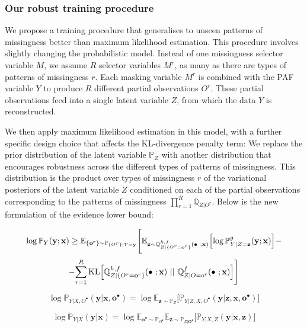 \documentclass[a4paper,12pt,twoside,openright]{article}
\newcommand{\draft}[1]{\textcolor{blue}{#1}}
\begin{document}

\subsubsection{Our robust training procedure}

We propose a training procedure that generalises to unseen patterns of missingness better than maximum likelihood estimation. This procedure involves slightly changing the probabilistic model. Instead of one missingness selector variable $M$, we assume $R$ selector variables $M^r$, as many as there are types of patterns of missingness $r$. Each masking variable $M^r$ is combined with the PAF variable $Y$ to produce $R$ different partial observations $O^r$. These partial observations feed into a single latent variable $Z$, from which the data $Y$ is reconstructed. 

We then apply maximum likelihood estimation in this model, with a further specific design choice that affects the $\mathrm{KL}$-divergence penalty term: We replace the prior distribution of the latent variable $\mathbb{P}_Z$ with another distribution that encourages robustness across the different types of patterns of missingness. This distribution is the product over types of missingness $r$ of the variational posteriors of the latent variable $Z$ conditioned on each of the partial observations corresponding to the patterns of missingness $\prod_{r = 1}^R \mathbb{Q}_{Z | O^r}$. Below is the new formulation of the evidence lower bound:

\[
    \log \mathbb{P}_Y (\mathbf{y} ; \mathbf{x}) \geq \mathbb{E}_{\{\mathbf{o^r}\} \sim \mathbb{P}_{\{O^r\} |Y=\mathbf{y}}} \Biggl[ \mathbb{E}_{\mathbf{z} \sim \mathbb{Q}^{h,f}_{Z | \{O^r = \mathbf{o}^r\}} (\bullet~ ; \mathbf{x})} \Bigl[\log \mathbb{P}^g_{Y | Z = \mathbf{z}} (\mathbf{y} ; \mathbf{x})\Bigr] \Biggr. - 
\]
\[
    - \Biggl. \sum_{r=1}^R  \mathrm{KL} \Bigl[ \mathbb{Q}^{h,f}_{Z | \{O^r = \mathbf{o}^r\}} (\bullet ~ ; \mathbf{x}) ~||~ \mathbb{Q}^{f}_{Z | O = o^r} (\bullet ~ ; \mathbf{x}) \Bigr] \Biggr]
\]

\[
    \log \mathbb{P}_{Y|X, O^\bullet} (\mathbf{y} | \mathbf{x}, \mathbf{o}^\bullet) = \log \mathbb{E}_{\mathbf{z} \sim \mathbb{P}_Z} \bigl[ \mathbb{P}_{Y | Z, X, O^\bullet} (\mathbf{y} | \mathbf{z}, \mathbf{x}, \mathbf{o}^\bullet) \bigr]
\]

\[
    \log \mathbb{P}_{Y | X} (\mathbf{y} | \mathbf{x}) = \log \mathbb{E}_{\mathbf{o}^\bullet \sim \mathbb{P}_{O^\bullet}} \mathbb{E}_{\mathbf{z} \sim \mathbb{P}_{Z | \mathbf{O}^\bullet}} \bigl[ \mathbb{P}_{Y | X, Z} (\mathbf{y} | \mathbf{x}, \mathbf{z}) \bigr]
\]
\end{document}
